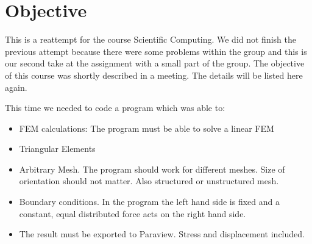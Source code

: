 \chapter{Objective}
This is a reattempt for the course Scientific Computing. We did not finish the previous attempt because there were some problems within the group and this is our second take at the assignment with a small part of the group. The objective of this course was shortly described in a meeting. The details will be listed here again.

This time we needed to code a program which was able to:
\begin{itemize}
\item FEM calculations: The program must be able to solve a linear FEM
\item Triangular Elements
\item Arbitrary Mesh. The program should work for different meshes. Size of orientation should not matter. Also structured or unstructured mesh.
\item Boundary conditions. In the program the left hand side is fixed and a constant, equal distributed force acts on the right hand side.
\item The result must be exported to Paraview. Stress and displacement included.
\end{itemize}